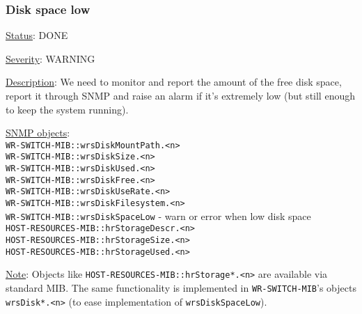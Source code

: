\subsubsection{\bf Disk space low}
		\label{fail:other:no_disk}
		\begin{packed_enum}
			\item [] \underline{Status}: DONE
			\item [] \underline{Severity}: WARNING
			\item [] \underline{Description}:
				We need to monitor and report the amount of the
				free disk space, report it through SNMP and raise an alarm if it's extremely
				low (but still enough to keep the system running).
			\item [] \underline{SNMP objects}:\\
				\texttt{WR-SWITCH-MIB::wrsDiskMountPath.<n>}\\
				\texttt{WR-SWITCH-MIB::wrsDiskSize.<n>}\\
				\texttt{WR-SWITCH-MIB::wrsDiskUsed.<n>}\\
				\texttt{WR-SWITCH-MIB::wrsDiskFree.<n>}\\
				\texttt{WR-SWITCH-MIB::wrsDiskUseRate.<n>}\\
				\texttt{WR-SWITCH-MIB::wrsDiskFilesystem.<n>}\\
				\texttt{WR-SWITCH-MIB::wrsDiskSpaceLow} - warn or error when low disk space\\
				\texttt{HOST-RESOURCES-MIB::hrStorageDescr.<n>}\\
				\texttt{HOST-RESOURCES-MIB::hrStorageSize.<n>}\\
				\texttt{HOST-RESOURCES-MIB::hrStorageUsed.<n>}
			\item [] \underline{Note}:
				Objects like \texttt{HOST-RESOURCES-MIB::hrStorage*.<n>} are available via standard MIB.
				The same functionality is implemented in \texttt{WR-SWITCH-MIB}'s objects
				\texttt{wrsDisk*.<n>}
				(to ease implementation of \texttt{wrsDiskSpaceLow}).
		\end{packed_enum}

